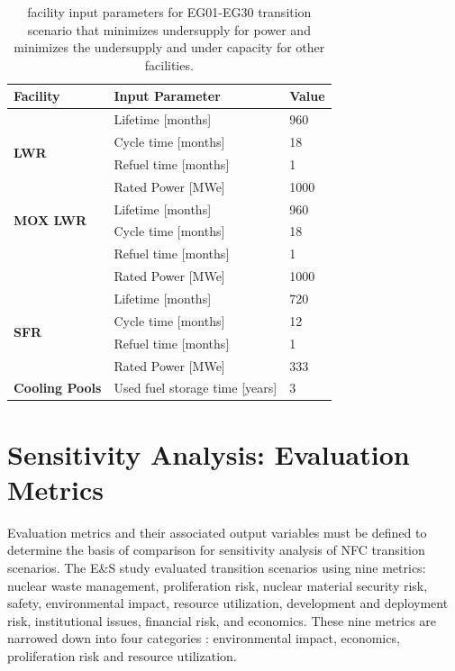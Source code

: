 \begin{table}[H]
    \centering
    \doublespacing
    \caption{\Cyclus facility input parameters for
	EG01-EG30 transition scenario
	that minimizes undersupply for power and minimizes 
	the undersupply and under capacity for other facilities. }
	\label{tab:facinputs}
    \small
    \begin{tabular}{lll}
        \hline
        \textbf{Facility}                 & \textbf{Input Parameter}                    & \textbf{Value} \\ \hline
        \multirow{4}{*}{\textbf{LWR}}     & Lifetime {[}months{]}              & 960   \\
                                 & Cycle time {[}months{]}            & 18    \\
                                 & Refuel time {[}months{]}           & 1     \\
                                 & Rated Power {[}MWe{]}              & 1000  \\ \hline
        \multirow{2}{*}{\textbf{MOX LWR}} & Lifetime {[}months{]}              & 960   \\
                                 & Cycle time {[}months{]}            & 18    \\
                                 & Refuel time {[}months{]}           & 1     \\
                                 & Rated Power {[}MWe{]}              & 1000  \\ \hline
        \multirow{4}{*}{\textbf{SFR}}     & Lifetime {[}months{]}              & 720   \\
                                 & Cycle time {[}months{]}            & 12    \\
                                 & Refuel time {[}months{]}           & 1     \\
                                 & Rated Power {[}MWe{]}              & 333   \\ \hline
        \textbf{Cooling Pools}            & Used fuel storage time {[}years{]} & 3  \\ \hline
        \end{tabular}
    \end{table}

\section{Sensitivity Analysis: Evaluation Metrics}
Evaluation metrics and their associated output variables 
must be defined to determine the basis of comparison for sensitivity 
analysis of \gls{NFC} transition scenarios.
The E\&S study \cite{wigeland_nuclear_2014} evaluated transition 
scenarios using nine metrics: nuclear waste 
management, proliferation risk, nuclear material security risk, 
safety, environmental impact, resource utilization, development 
and deployment risk, institutional issues, financial risk, and 
economics. 
These nine metrics are narrowed down into four categories
 \cite{passerini_systematic_2014}: environmental 
impact, economics, proliferation risk and resource utilization. 

